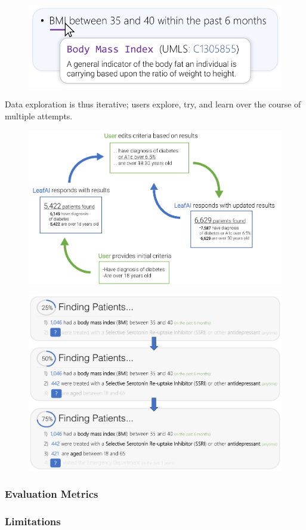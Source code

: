 \documentclass[../main.tex]{subfiles}
\begin{document}
\begin{figure}[h!]
  \centering
  \includegraphics[scale=1]{Figures/Aim3/aim3_mouse_hover.pdf}  
  \caption{}
\label{aim3_fig_mouse_hover}
\end{figure}

Data exploration is thus iterative; users explore, try, and learn over the course of multiple attempts.

\begin{figure}[h!]
  \centering
  \includegraphics[scale=1]{Figures/Aim3/aim3_feedback_loop.pdf}  
  \caption{}
\label{aim3_fig_feedback_loop}
\end{figure}

\begin{figure}[h!]
  \centering
  \includegraphics[scale=0.5]{Figures/Aim3/aim3_query_progress.pdf}  
  \caption{}
\label{aim3_fig_query_progress}
\end{figure}

\subsubsection{Evaluation Metrics}

\subsubsection{Limitations}
\end{document}
